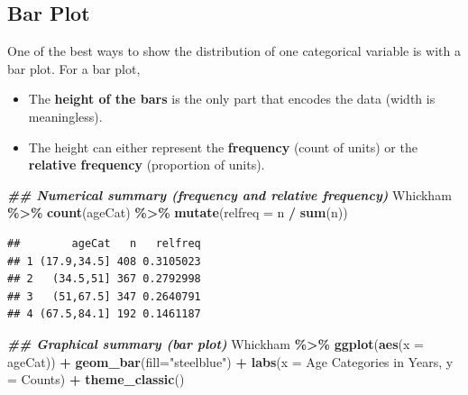 \documentclass[
]{book}
\newenvironment{Shaded}{\begin{snugshade}}{\end{snugshade}}
\newcommand{\AttributeTok}[1]{\textcolor[rgb]{0.13,0.29,0.53}{#1}}
\newcommand{\DocumentationTok}[1]{\textcolor[rgb]{0.56,0.35,0.01}{\textbf{\textit{#1}}}}
\newcommand{\FunctionTok}[1]{\textcolor[rgb]{0.13,0.29,0.53}{\textbf{#1}}}
\newcommand{\NormalTok}[1]{#1}
\newcommand{\SpecialCharTok}[1]{\textcolor[rgb]{0.81,0.36,0.00}{\textbf{#1}}}
\newcommand{\StringTok}[1]{\textcolor[rgb]{0.31,0.60,0.02}{#1}}
\providecommand{\tightlist}{%
  \setlength{\itemsep}{0pt}\setlength{\parskip}{0pt}}
\begin{document}
\subsection{Bar Plot}\label{bar-plot}

One of the best ways to show the distribution of one categorical variable is with a bar plot. For a bar plot,

\begin{itemize}
\tightlist
\item
  The \textbf{height of the bars} is the only part that encodes the data (width is meaningless).
\item
  The height can either represent the \textbf{frequency} (count of units) or the \textbf{relative frequency} (proportion of units).
\end{itemize}

\begin{Shaded}
\begin{Highlighting}[]
\DocumentationTok{\#\# Numerical summary (frequency and relative frequency)}
\NormalTok{Whickham }\SpecialCharTok{\%\textgreater{}\%}
    \FunctionTok{count}\NormalTok{(ageCat) }\SpecialCharTok{\%\textgreater{}\%}
    \FunctionTok{mutate}\NormalTok{(}\AttributeTok{relfreq =}\NormalTok{ n }\SpecialCharTok{/} \FunctionTok{sum}\NormalTok{(n)) }
\end{Highlighting}
\end{Shaded}

\begin{verbatim}
##        ageCat   n   relfreq
## 1 (17.9,34.5] 408 0.3105023
## 2   (34.5,51] 367 0.2792998
## 3   (51,67.5] 347 0.2640791
## 4 (67.5,84.1] 192 0.1461187
\end{verbatim}

\begin{Shaded}
\begin{Highlighting}[]
\DocumentationTok{\#\# Graphical summary (bar plot)}
\NormalTok{Whickham }\SpecialCharTok{\%\textgreater{}\%}
    \FunctionTok{ggplot}\NormalTok{(}\FunctionTok{aes}\NormalTok{(}\AttributeTok{x =}\NormalTok{ ageCat)) }\SpecialCharTok{+} 
    \FunctionTok{geom\_bar}\NormalTok{(}\AttributeTok{fill=}\StringTok{"steelblue"}\NormalTok{) }\SpecialCharTok{+} 
    \FunctionTok{labs}\NormalTok{(}\AttributeTok{x =} \StringTok{\textquotesingle{}Age Categories in Years\textquotesingle{}}\NormalTok{, }\AttributeTok{y =} \StringTok{\textquotesingle{}Counts\textquotesingle{}}\NormalTok{) }\SpecialCharTok{+} 
    \FunctionTok{theme\_classic}\NormalTok{()}
\end{Highlighting}
\end{Shaded}
\end{document}

